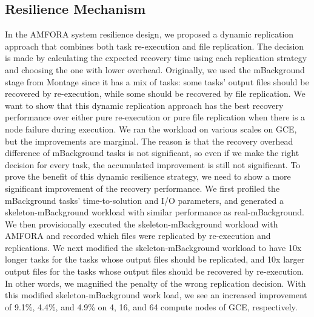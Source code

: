 \documentclass[preprint,12pt]{elsarticle}
\begin{document}
\subsection{Resilience Mechanism}
In the AMFORA system resilience design, we proposed a dynamic replication approach that combines both task re-execution and file replication. 
The decision is made by calculating the expected recovery time using each replication strategy and choosing the one with lower overhead.
Originally, we used the mBackground stage from Montage since it has a mix of tasks: some tasks' output files should be recovered by re-execution, while
some should be recovered by file replication. 
We want to show that this dynamic replication approach has the best recovery performance over either pure re-execution or pure file replication when there
is a node failure during execution.
We ran the workload on various scales on GCE, but the improvements are marginal. 
The reason is that the recovery overhead difference of mBackground tasks is not significant, so even if we make the right decision for every task, the accumulated
improvement is still not significant.
To prove the benefit of this dynamic resilience strategy, we need to show  a more significant improvement of the recovery performance. We first profiled the mBackground tasks' time-to-solution and I/O parameters, and generated a skeleton-mBackground workload with similar performance as real-mBackground. We then provisionally executed the skeleton-mBackground workload with AMFORA and recorded which files were replicated by re-execution and replications.
We next modified the skeleton-mBackground workload to have 10x longer tasks for the tasks whose output files
should be replicated, and 10x larger output files for the tasks whose output files should be recovered by re-execution. 
In other words, we magnified the penalty of the wrong replication decision.
With this modified skeleton-mBackground work load, we see an increased improvement of 9.1\%, 4.4\%, and 4.9\% on 4, 16, and 64 compute nodes of GCE, respectively.
\end{document}
